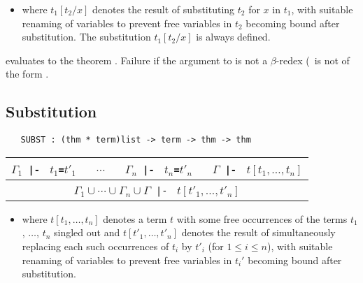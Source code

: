 \begin{itemize}
\item where $t_1[t_2/x]$ denotes the result of substituting $t_2$ for $x$
in $t_1$, with suitable renaming of variables to prevent free variables
in $t_2$ becoming bound after substitution. The substitution
 $t_1[t_2/x]$ is always defined.
\end{itemize}


\noindent {} evaluates to the
theorem .
Failure if the argument to  is not a $\beta$-redex (\ie\ is not
of the form .

\bigskip

\subsection{Substitution}

\begin{boxed}
\begin{verbatim}
   SUBST : (thm * term)list -> term -> thm -> thm
\end{verbatim}\end{boxed}

\begin{center}
\begin{tabular}{c}
$\Gamma_1${\small\verb+ |- +} $t_1${\small\verb+=+}$t'_1$ {\small\verb+  +} $\cdots$ {\small\verb+  +}
$\Gamma_n${\small\verb+ |- +} $t_n${\small\verb+=+}$t'_n$ {\small\verb+  +}
$\Gamma${\small\verb+ |- +} $t[t_1,\ldots,t_n]$ \\ \hline
$\Gamma_1 \cup \cdots
\cup \Gamma_n \cup \Gamma${\small\verb+ |- +} $t[t'_1,\ldots,t'_n]$ \\
\end{tabular}
\end{center}

\bigskip

\begin{itemize}
\item where $t[t_1,\ldots,t_n]$ denotes a term $t$ with some free
occurrences of the terms $t_1$, $\dots$, $t_n$ singled out and
$t[t'_1,\ldots,t'_n]$ denotes the result of simultaneously replacing each
such occurrences of $t_i$ by $t'_i$ (for $1{\leq}i {\leq} n$),
with suitable renaming of variables to prevent free variables
in $t_i'$ becoming bound after substitution.
\end{itemize}

